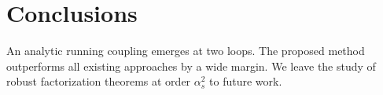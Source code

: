 \section{Conclusions}\label{sec:conclusions}

An analytic running coupling emerges at two loops. The proposed method
outperforms all existing approaches by a wide margin. We leave the study
of robust factorization theorems at order $\alpha_s^2$ to future work.

